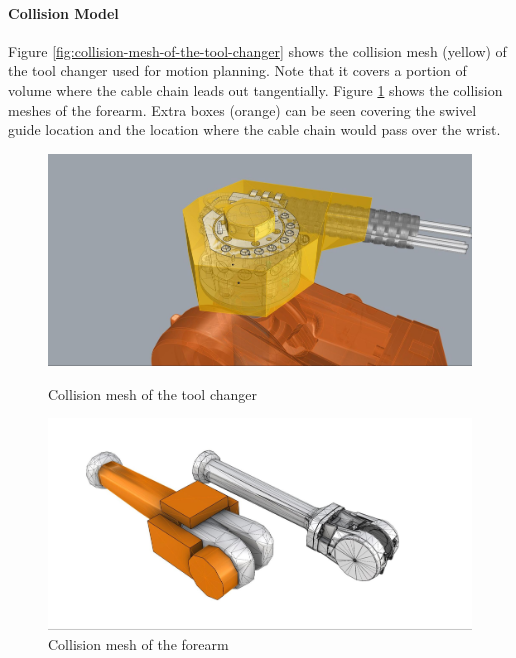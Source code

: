 \paragraph{Collision Model}

Figure \ref{fig:collision-mesh-of-the-tool-changer} shows the collision mesh (yellow) of the tool changer used for motion planning. Note that it covers a portion of volume where the cable chain leads out tangentially. Figure \ref{fig:collision-mesh-of-the-forearm} shows the collision meshes of the forearm. Extra boxes (orange) can be seen covering the swivel guide location and the location where the cable chain would pass over the wrist.

\begin{figure}[!h]
    \centering
    \begin{minipage}{0.49\textwidth}
        \centering
        \includegraphics[width=\textwidth]{images/6a/img09.jpg}
        \caption{Collision mesh of the tool changer}
        \label{fig:collision-mesh-of-the-tool-changer}
    \end{minipage}
    \hfill
    \begin{minipage}{0.49\textwidth}
        \centering
        \includegraphics[width=\textwidth]{images/6a/img10.jpg}
        \caption{Collision mesh of the forearm}
        \label{fig:collision-mesh-of-the-forearm}
    \end{minipage}
\end{figure}

